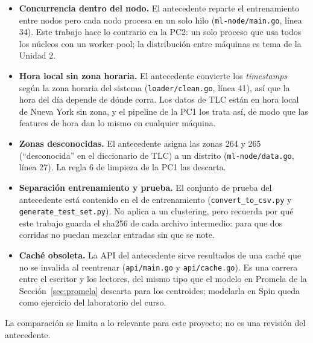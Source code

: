 \begin{itemize}
  \item \textbf{Concurrencia dentro del nodo.} El antecedente reparte el entrenamiento entre nodos
        pero cada nodo procesa en un solo hilo (\texttt{ml-node/main.go}, línea 34). Este trabajo
        hace lo contrario en la PC2: un solo proceso que usa todos los núcleos con un worker pool;
        la distribución entre máquinas es tema de la Unidad 2.
  \item \textbf{Hora local sin zona horaria.} El antecedente convierte los \emph{timestamps} según la
        zona horaria del sistema (\texttt{loader/clean.go}, línea 41), así que la hora del día
        depende de dónde corra. Los datos de TLC están en hora local de Nueva York sin zona, y el
        pipeline de la PC1 los trata así, de modo que las features de hora dan lo mismo en cualquier
        máquina.
  \item \textbf{Zonas desconocidas.} El antecedente asigna las zonas 264 y 265 (\enquote{desconocida}
        en el diccionario de TLC) a un distrito (\texttt{ml-node/data.go}, línea 27). La regla 6 de
        limpieza de la PC1 las descarta.
  \item \textbf{Separación entrenamiento y prueba.} El conjunto de prueba del antecedente está
        contenido en el de entrenamiento (\texttt{convert\_to\_csv.py} y
        \texttt{generate\_test\_set.py}). No aplica a un clustering, pero recuerda por qué este
        trabajo guarda el sha256 de cada archivo intermedio: para que dos corridas no puedan mezclar
        entradas sin que se note.
  \item \textbf{Caché obsoleta.} La API del antecedente sirve resultados de una caché que no se
        invalida al reentrenar (\texttt{api/main.go} y \texttt{api/cache.go}). Es una carrera entre
        el escritor y los lectores, del mismo tipo que el modelo en Promela de la
        Sección~\ref{sec:promela} descarta para los centroides; modelarla en Spin queda como
        ejercicio del laboratorio del curso.
\end{itemize}

La comparación se limita a lo relevante para este proyecto; no es una revisión del antecedente.
